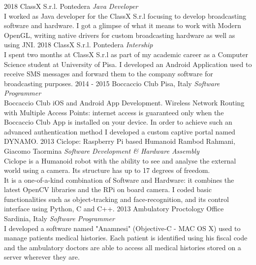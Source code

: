 \documentclass[]{friggeri-cv}
\begin{document}
\begin{entrylist}
\entry
{2018}
{ClassX S.r.l.}
{Pontedera}
{\emph{Java Developer} \\
I worked as Java developer for the ClassX S.r.l focusing to develop broadcasting software and hardware. I got a glimpse of what it means to work with Modern OpenGL, writing native drivers for custom broadcasting hardware as well as using JNI.}
\entry
{2018}
{ClassX S.r.l.}
{Pontedera}
{\emph{Intership} \\
I spent two months at ClassX S.r.l as part of my academic career as a Computer Science student at University of Pisa. I developed an Android Application used to receive SMS messages and forward them to the company software for broadcasting purposes.}
\entry
{2014 - 2015}
{Boccaccio Club}
{Pisa, Italy}
{\emph{Software Programmer} \\
Boccaccio Club iOS and Android App Development. Wireless Network Routing with Multiple Access Points: internet access is guaranteed only when the Boccaccio Club App is installed on your device. In order to achieve such an advanced authentication method I developed a custom captive portal named DYNAMO.}
\entry
{2013}
{Ciclope: Raspberry Pi based Humanoid}
{Rambod Rahmani, Giacomo Taormina}
{\emph{Software Development \& Hardware Assembly} \\
Ciclope is a Humanoid robot with the ability to see and analyse the external world using a camera. Its structure has up to 17 degrees of freedom.\\
It is a one-of-a-kind combination of Software and Hardware: it combines the latest OpenCV libraries and the RPi on board camera. I coded basic functionalities such as object-tracking and face-recognition, and its control interface using Python, C and C++.}
\entry
{2013}
{Ambulatory Proctology Office}
{Sardinia, Italy}
{\emph{Software Programmer} \\
I developed a software named "Anamnesi" (Objective-C - MAC OS X) used to manage patients medical histories. Each patient is identified using his fiscal code and the ambulatory doctors are able to access all medical histories stored on a server wherever they are.}

\end{entrylist}
\end{document}
